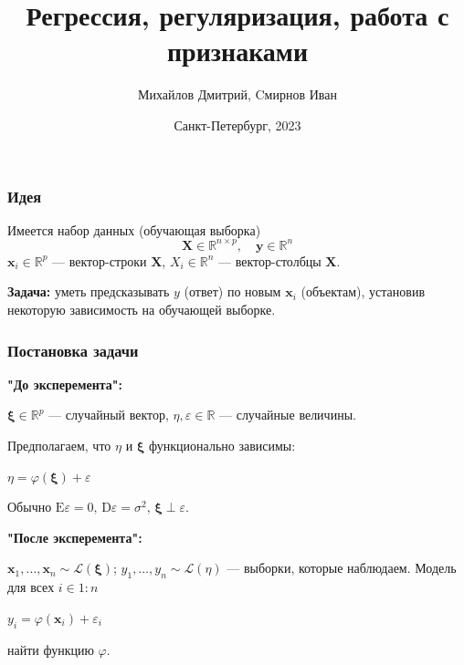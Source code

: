 \documentclass[ucs, notheorems, handout]{beamer}
\title[Регрессия, регуляризация, работа с признаками]{%
	     Регрессия, регуляризация, работа с признаками}
\author[Михайлов Дмитрий, Cмирнов Иван]{Михайлов Дмитрий, Cмирнов Иван}
\institute[Санкт-Петербургский Государственный Университет]{%
	    \small
	    Санкт-Петербургский государственный университет\\
	    Кафедра статистического моделирования\\
	    \vspace{1.25cm}
	}
\date[]{Санкт-Петербург, 2023}
\newcommand{\E}{\mathrm{E}}
\newcommand{\D}{\mathrm{D}}
\newcommand{\X}{\bm{X}}
\begin{document}
	
	\begin{frame}[plain]
	    \titlepage
	\end{frame}
	
	
	\begin{frame}
	    \frametitle{Идея}
	
	
	Имеется набор данных (обучающая выборка)
	$$
	\X \in \mathbb{R}^{n\times p}, \quad \bm y \in \mathbb R^n
	$$ 
	\vspace{0.5cm}   
	$\mathbf x_i \in \mathbb R^p$ --- вектор-строки $\X$, $X_i \in \mathbb R^n$ --- вектор-столбцы $\X$.
	
	\textbf{Задача:} уметь предсказывать $y$ (ответ) по новым $\mathbf x_i$ (объектам), установив некоторую зависимость на обучающей выборке.
	\vspace{0.5cm}  
	
	\end{frame}
	
	
	
	
	
	
	\begin{frame}
	    \frametitle{Постановка задачи}
	    \vspace*{-5mm}
	\begin{center}
		\textbf{"До эксперемента":}
	\end{center}
	
	$\bm \xi \in \mathbb R^p$ --- случайный вектор, $\eta, \varepsilon \in \mathbb R$ --- случайные величины.
	
	Предполагаем, что $\eta$ и $\bm \xi$ функционально зависимы:
	\begin{block}{}
	\centering
	$\eta = \varphi(\bm \xi) + \varepsilon$
	\end{block}
	Обычно $\E \varepsilon = 0, \, \D \varepsilon = \sigma^2,\, \bm\xi \perp \varepsilon. $
	\begin{center}
	\textbf{"После эксперемента":}
	\end{center}
	$\mathbf x_1, \ldots, \mathbf x_n \sim \mathcal L(\bm \xi)$; $y_1, \ldots, y_n \sim \mathcal L(\eta)$ --- выборки, которые наблюдаем.
	Модель для всех $i \in 1:n$ 
	\begin{block}{}
	\centering
	$y_i = \varphi(\mathbf x_i) + \varepsilon_i$
	\end{block}
	
	\textbf{{\color{blue}{Задача:}}} найти функцию $\varphi$.
	
	\end{frame}
	
\end{document}
